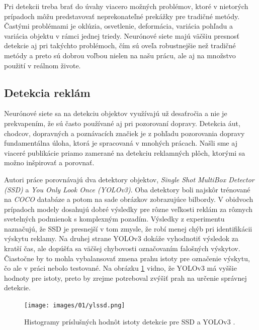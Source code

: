 Pri detekcii treba brať do úvahy viacero možných problémov, ktoré v nietorých prípadoch môžu predstavovať neprekonateľné prekážky pre tradičné metódy. Častými problémami je oklúzia, osvetlenie, deformácia, variácia pohľadu a variácia objektu v rámci jednej triedy. Neurónové siete majú väčšiu presnosť detekcie aj pri takýchto problémoch, čím sú oveľa robustnejšie než tradičné metódy a preto sú dobrou voľbou nielen na našu prácu, ale aj na množstvo použití v reálnom živote.

\subsection{Detekcia reklám}

Neurónové siete sa na detekciu objektov využívajú už desaťročia a nie je prekvapením, že sú často používané aj pri pozorovaní dopravy. Detekcia áut, chodcov, dopravných a poznávacích značiek je z pohľadu pozorovania dopravy fundamentálna úloha, ktorá je spracovaná v mnohých prácach. Našli sme aj viaceré publikácie priamo zamerané na detekciu reklamných plôch, ktorými sa možno inšpirovať a porovnať.

Autori práce \cite{SSD-YOLO} porovnávajú dva detektory objektov, \textit{Single Shot MultiBox Detector (SSD)} a \textit{You Only Look Once (YOLOv3)}. Oba detektory boli najskôr trénované na \textit{COCO} databáze \cite{Coco} a potom na sade obrázkov zobrazujúce bilbordy. V obidvoch prípadoch modely dosahujú dobré výsledky pre rôzne veľkosti reklám za rôznych svetelných podmienok s komplexným pozadím. Výsledky z experimentu naznačujú, že SSD je presnejší v tom zmysle, že robí menej chýb pri identifikácii výskytu reklamy. Na druhej strane YOLOv3 dokáže vyhodnotiť výsledok za kratší čas, ale dopúšťa sa väčšej chybovosti označovaním falošných výskytov. Čiastočne by to mohla vybalansovať zmena prahu istoty pre označenie výskytu, čo ale v práci nebolo testované. Na obrázku \ref{img:ssd-yolo} vidno, že YOLOv3 má vyššie hodnoty pre istoty, preto by zrejme potreboval zvýšiť prah na určenie správnej detekcie.

\begin{figure}[H]
    \centering
    \texttt{[image: images/01/ylssd.png]}
    \caption{Histogramy príslušných hodnôt istoty detekcie pre SSD a YOLOv3 \cite{SSD-YOLO}.}
    \label{img:ssd-yolo}
\end{figure}


